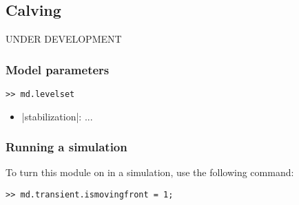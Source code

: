 
\subsection{Calving} \label{sec:using-issm-parameterization-calving}
UNDER DEVELOPMENT

\subsubsection{Model parameters}

\begin{lstlisting}
>> md.levelset
\end{lstlisting}

\begin{itemize}
	\item \lstinlinebg|stabilization|: ...
\end{itemize}

\subsubsection{Running a simulation}
To turn this module on in a simulation, use the following command:
\begin{lstlisting}
>> md.transient.ismovingfront = 1;
\end{lstlisting}

\clearpage %
